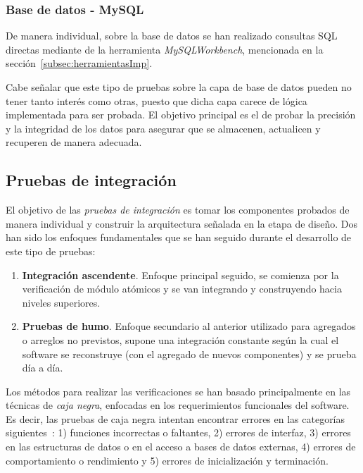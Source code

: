 \subsubsection{Base de datos - MySQL}

De manera individual, sobre la base de datos se han realizado consultas SQL directas mediante de la herramienta \emph{MySQLWorkbench}, mencionada en la sección~\ref{subsec:herramientasImp}. 

Cabe señalar que este tipo de pruebas sobre la capa de base de datos pueden no tener tanto interés como otras, puesto que dicha capa carece de lógica implementada para ser probada. El objetivo principal es el de probar la precisión y la integridad de los datos para asegurar que se almacenen, actualicen y recuperen de manera adecuada.

\subsection{Pruebas de integración}

El objetivo de las \emph{pruebas de integración} es tomar los componentes probados de manera individual y construir la arquitectura señalada en la etapa de diseño. Dos han sido los enfoques fundamentales que se han seguido durante el desarrollo de este tipo de pruebas:

\begin{enumerate}
	\item \textbf{Integración ascendente}. Enfoque principal seguido, se comienza por la verificación de módulo atómicos y se van integrando y construyendo hacia niveles superiores.
	\item \textbf{Pruebas de humo}. Enfoque secundario al anterior utilizado para agregados o arreglos no previstos, supone una integración constante según la cual el software se reconstruye (con el agregado de nuevos componentes) y se prueba día a día.
\end{enumerate}

Los métodos para realizar las verificaciones se han basado principalmente en las técnicas de \emph{caja negra}, enfocadas en los requerimientos funcionales del software. Es decir, las pruebas de caja negra intentan encontrar errores en las categorías siguientes~\cite{Pre10}: 1) funciones incorrectas o faltantes, 2) errores de interfaz, 3) errores en las estructuras de datos o en el acceso a bases de datos externas, 4) errores de comportamiento o rendimiento y 5) errores de inicialización y terminación.

